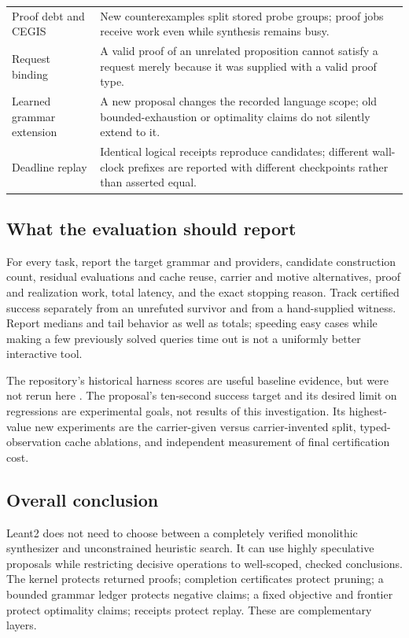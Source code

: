 \documentclass[11pt,a4paper]{article}
\theoremstyle{definition}
\theoremstyle{remark}
\begin{document}
\begin{longtable}{@{}L{41mm}L{101mm}@{}}
Proof debt and CEGIS & New counterexamples split stored probe groups; proof jobs receive work even while synthesis remains busy.\\
Request binding & A valid proof of an unrelated proposition cannot satisfy a request merely because it was supplied with a valid proof type.\\
Learned grammar extension & A new proposal changes the recorded language scope; old bounded-exhaustion or optimality claims do not silently extend to it.\\
Deadline replay & Identical logical receipts reproduce candidates; different wall-clock prefixes are reported with different checkpoints rather than asserted equal.\\
\bottomrule
\end{longtable}

\subsection{What the evaluation should report}
For every task, report the target grammar and providers, candidate construction
count, residual evaluations and cache reuse, carrier and motive alternatives,
proof and realization work, total latency, and the exact stopping reason.
Track certified success separately from an unrefuted survivor and from a
hand-supplied witness. Report medians and tail behavior as well as totals;
speeding easy cases while making a few previously solved queries time out is
not a uniformly better interactive tool.

The repository's historical harness scores are useful baseline evidence, but
were not rerun here \cite{repo}. The proposal's ten-second success target and
its desired limit on regressions are experimental goals, not results of this
investigation. Its highest-value new experiments are the carrier-given versus
carrier-invented split, typed-observation cache ablations, and independent
measurement of final certification cost.

\subsection{Overall conclusion}
Leant2 does not need to choose between a completely verified monolithic
synthesizer and unconstrained heuristic search. It can use highly speculative
proposals while restricting decisive operations to well-scoped, checked
conclusions. The kernel protects returned proofs; completion certificates
protect pruning; a bounded grammar ledger protects negative claims; a fixed
objective and frontier protect optimality claims; receipts protect replay.
These are complementary layers.
\end{document}
